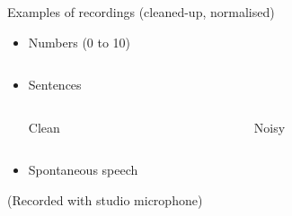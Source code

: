 \documentclass[compress]{beamer}
\begin{document}

\begin{frame}{Examples of recordings (cleaned-up, normalised)}

\begin{itemize}

\item Numbers (0 to 10)
    \begin{columns}
        \begin{column}{0.5\linewidth}
            \begin{center}
            \end{center}

        \end{column}
        \begin{column}{0.5\linewidth}
            \begin{center}
            \end{center}

        \end{column}
    \end{columns}

\item Sentences

    \begin{columns}
        \begin{column}{0.5\linewidth}
            \begin{center}

                {\footnotesize Clean}
            \end{center}

        \end{column}
        \begin{column}{0.5\linewidth}
            \begin{center}


    {\footnotesize Noisy}
            \end{center}
        \end{column}
    \end{columns}

\item Spontaneous speech


    \begin{center}
        \hspace{2em}
        \hspace{2em}
        \hspace{2em}
    \end{center}

\end{itemize}
(Recorded with studio microphone)

\end{frame}
\end{document}
